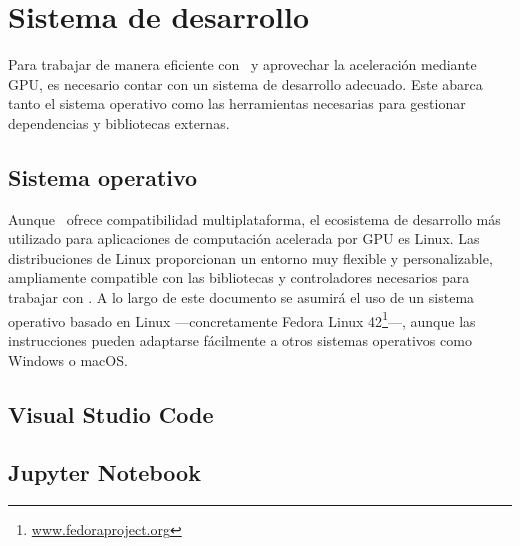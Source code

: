 \pagestyle{fancy}
\fancyhead[l]{\autorUO}
\fancyfoot[l]{\asignaturaAbbr}
\fancyfoot[r]{\fecha}

\section{Sistema de desarrollo} \label{sec:intro_dev_system}
Para trabajar de manera eficiente con \pytorch\ y aprovechar la aceleración mediante GPU, es necesario contar con un sistema de
desarrollo adecuado. Este abarca tanto el sistema operativo como las herramientas necesarias para gestionar dependencias y bibliotecas externas.

\subsection{Sistema operativo} \label{sec:intro_os}
Aunque \pytorch\ ofrece compatibilidad multiplataforma, el ecosistema de desarrollo más utilizado para aplicaciones de computación acelerada
por GPU es Linux. Las distribuciones de Linux proporcionan un entorno muy flexible y personalizable, ampliamente compatible con las bibliotecas
y controladores necesarios para trabajar con \pytorch. A lo largo de este documento se asumirá el uso de un sistema operativo basado en Linux
—concretamente Fedora Linux 42\footnote{\url{www.fedoraproject.org}}—, aunque las instrucciones pueden adaptarse fácilmente a otros sistemas operativos como Windows o macOS.

\subsection{Visual Studio Code} \label{sec:intro_vscode}

\subsection{Jupyter Notebook} \label{sec:intro_jupyter}